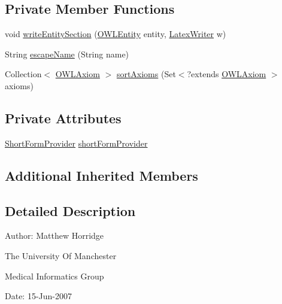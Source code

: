 \subsection*{Private Member Functions}
\begin{DoxyCompactItemize}
\item 
void \hyperlink{classorg_1_1coode_1_1owlapi_1_1latex_1_1_latex_renderer_a1b8a9308cabc15b01fdbf028c9dde128}{write\-Entity\-Section} (\hyperlink{interfaceorg_1_1semanticweb_1_1owlapi_1_1model_1_1_o_w_l_entity}{O\-W\-L\-Entity} entity, \hyperlink{classorg_1_1coode_1_1owlapi_1_1latex_1_1_latex_writer}{Latex\-Writer} w)
\item 
String \hyperlink{classorg_1_1coode_1_1owlapi_1_1latex_1_1_latex_renderer_a5c0cb69ed5489e4beb0f45a6c2a71551}{escape\-Name} (String name)
\item 
Collection$<$ \hyperlink{interfaceorg_1_1semanticweb_1_1owlapi_1_1model_1_1_o_w_l_axiom}{O\-W\-L\-Axiom} $>$ \hyperlink{classorg_1_1coode_1_1owlapi_1_1latex_1_1_latex_renderer_ac51bf8e91796c3e4963fa580a12b0d2e}{sort\-Axioms} (Set$<$?extends \hyperlink{interfaceorg_1_1semanticweb_1_1owlapi_1_1model_1_1_o_w_l_axiom}{O\-W\-L\-Axiom} $>$ axioms)
\end{DoxyCompactItemize}
\subsection*{Private Attributes}
\begin{DoxyCompactItemize}
\item 
\hyperlink{interfaceorg_1_1semanticweb_1_1owlapi_1_1util_1_1_short_form_provider}{Short\-Form\-Provider} \hyperlink{classorg_1_1coode_1_1owlapi_1_1latex_1_1_latex_renderer_a988ecbd7d880d0c244749e1556a8b74b}{short\-Form\-Provider}
\end{DoxyCompactItemize}
\subsection*{Additional Inherited Members}


\subsection{Detailed Description}
Author\-: Matthew Horridge\par
 The University Of Manchester\par
 Medical Informatics Group\par
 Date\-: 15-\/\-Jun-\/2007\par
\par
 

